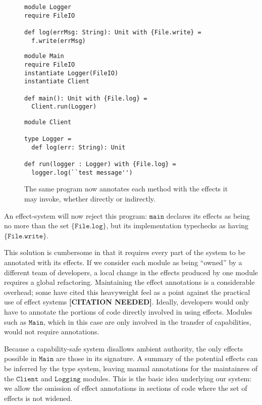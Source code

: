 \documentclass[a4paper,UKenglish]{lipics-v2016}
\newcommand{\kwa}[1]{\mathtt{ #1 }}
\begin{document}
\begin{figure}[h]
\vspace{-5pt}
\begin{lstlisting}[mathescape]
module Logger
require FileIO

def log(errMsg: String): Unit with {File.write} =
  f.write(errMsg)
\end{lstlisting}

\begin{lstlisting}
module Main
require FileIO
instantiate Logger(FileIO)
instantiate Client

def main(): Unit with {File.log} =
  Client.run(Logger)
\end{lstlisting}

\begin{lstlisting}
module Client

type Logger =
  def log(err: String): Unit

def run(logger : Logger) with {File.log} =
  logger.log(``test message'')
\end{lstlisting}

\vspace{-7pt}
\caption{The same program now annotates each method with the effects it may invoke, whether directly or indirectly. }
\label{f-resource-modules}
\end{figure}

An effect-system will now reject this program: $\kwa{main}$ declares its effects as being no more than the set $\kwa{ \{File.log\} }$, but its implementation typechecks as having $\kwa{ \{File.write\} }$.

This solution is cumbersome in that it requires every part of the system to be annotated with its effects. If we consider each module as being ``owned'' by a different team of developers, a local change in the effects produced by one module requires a global refactoring. Maintaining the effect annotations is a considerable overhead; some have cited this heavyweight feel as a point against the practical use of effect systems \textbf{[CITATION NEEDED]}. Ideally, developers would only have to annotate the portions of code directly involved in using effects. Modules such as $\kwa{Main}$, which in this case are only involved in the transfer of capabilities, would not require annotations.

Because a capability-safe system disallows ambient authority, the only effects possible in $\kwa{Main}$ are those in its signature. A summary of the potential effects can be inferred by the type system, leaving manual annotations for the maintainres of the $\kwa{Client}$ and $\kwa{Logging}$ modules. This is the basic idea underlying our system: we allow the omission of effect annotations in sections of code where the set of effects is not widened.
\end{document}
